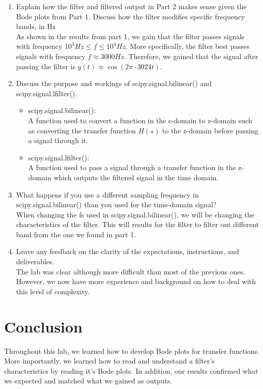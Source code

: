 \documentclass[12pt]{report}
\begin{document}
\begin{enumerate}
    \item 
    Explain how the filter and filtered output in Part 2 makes sense given the Bode plots from Part 1. Discuss how the filter modifies specific frequency bands, in Hz\\
    As shown in the results from part 1, we gain that the filter passes signals with frequency $10^3 Hz\le f \le 10^4 Hz$. More specifically, the filter best passes signals with frequency $f \approx 3000 Hz$. Therefore, we gained that the signal after passing the filter is $y(t)\approx \cos(2\pi\cdot3024t)$.\\
    
    \item
    Discuss the purpose and workings of scipy.signal.bilinear() and scipy.signal.lfilter().
    \begin{itemize}
        \item scipy.signal.bilinear():\\
        A function used to convert a function in the s-domain to z-domain such as converting the transfer function $H(s)$ to the z-domain before passing a signal through it.
        \item scipy.signal.lfilter():\\
        A function used to pass a signal through a transfer function in the z-domain which outputs the filtered signal in the time domain.\\
    \end{itemize}
    
    \item
    What happens if you use a different sampling frequency in scipy.signal.bilinear() than you used for the time-domain signal?\\
    When changing the fs used in scipy.signal.bilinear(), we will be changing the characteristics of the filter. This will results for the filter to filter out different band from the one we found in part 1.\\
    
    \item
    Leave any feedback on the clarity of the expectations, instructions, and deliverables.\\
    The lab was clear although more difficult than most of the previous ones. However, we now have more experience and background on how to deal with this level of complexity.
    
\end{enumerate}

\section{Conclusion}
Throughout this lab, we learned how to develop Bode plots for transfer functions. More importantly, we learned how to read and understand a filter's characteristics by reading it's Bode plots. In addition, our results confirmed what we expected and matched what we gained as outputs. 
\end{document}
